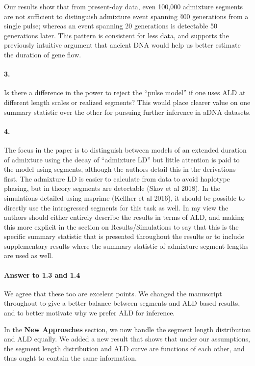 \documentclass[11pt]{article}
\let\oldparagraph\paragraph
\renewcommand{\paragraph}[1]{\oldparagraph{#1}\mbox{}}
\begin{document}
Our results show that from present-day data, even 100,000 admixture segments are not sufficient to distinguish admixture event spanning \~400 generations from a single pulse; whereas an event spanning 20 generations is detectable 50 generations later. This pattern is consistent for less data, and supports the previously intuitive argument that ancient DNA would help us better estimate the duration of gene flow.


\paragraph{3.}
Is there a difference in the power to reject the “pulse model” if one uses ALD at different length scales or realized segments? This would place clearer value on one summary statistic over the other for pursuing further inference in aDNA datasets. 

\paragraph{4.}
The focus in the paper is to distinguish between models of an extended duration of admixture using the decay of “admixture LD” but little attention is paid to the model using segments, although the authors detail this in the derivations first. The admixture LD is easier to calculate from data to avoid haplotype phasing, but in theory segments are detectable (Skov et al 2018). In the simulations detailed using msprime (Kellher et al 2016), it should be possible to directly use the introgressed segments for this task as well. In my view the authors should either entirely describe the results in terms of ALD, and making this more explicit in the section on Results/Simulations to say that this is the specific summary statistic that is presented throughout the results or to include supplementary results where the summary statistic of admixture segment lengths are used as well. 



\paragraph{Answer to 1.3 and 1.4}
We agree that these too are excelent points. We changed the manuscript throughout to give a better balance between segments and ALD based results, and to better motivate why we prefer ALD for inference.

In the \textbf{New Approaches} section, we now handle the segment length distribution and ALD equally. We added a new result that shows that under our assumptions, the segment length distribution and ALD curve are functions of each other, and thus ought to contain the same information.
\end{document}
